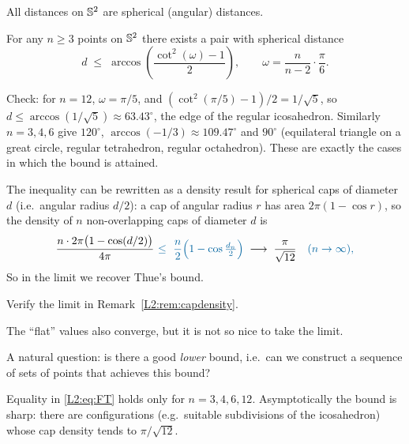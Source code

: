 All distances on $\mathbb{S}^2$ are spherical (angular) distances.

\begin{theorem}\label{L2:thm:FT}
For any $n\ge 3$ points on $\mathbb{S}^2$ there exists a pair with spherical distance
\begin{equation}\label{L2:eq:FT}
d \;\le\; \arccos\!\left(\frac{\cot^2(\omega)-1}{2}\right),
\qquad \omega=\frac{n}{n-2}\cdot\frac{\pi}{6}. \tag{$*$}
\end{equation}
\end{theorem}

\begin{addedblock}
Check: for $n=12$, $\omega=\pi/5$, and $(\cot^2(\pi/5)-1)/2 = 1/\sqrt5$, so
$d\le\arccos(1/\sqrt5)\approx 63.43^\circ$, the edge of the regular icosahedron. Similarly $n=3,4,6$ give
$120^\circ$, $\arccos(-1/3)\approx109.47^\circ$ and $90^\circ$ (equilateral triangle on a great circle,
regular tetrahedron, regular octahedron). These are exactly the cases in which the bound is attained.
\end{addedblock}

\begin{remark}\label{L2:rem:capdensity}
The inequality can be rewritten as a density result for spherical caps of diameter $d$ (i.e.\ angular
radius $d/2$): a cap of angular radius $r$ has area $2\pi(1-\cos r)$, so the density of $n$ non-overlapping
caps of diameter $d$ is
\[
\frac{n\cdot 2\pi\bigl(1-\cos(d/2)\bigr)}{4\pi}
\added{\ \le\ \frac n2\Bigl(1-\cos\tfrac{d_n}{2}\Bigr)}
\;\longrightarrow\; \frac{\pi}{\sqrt{12}}
\added{\quad (n\to\infty),}
\]
 So in the limit we recover Thue's bound.
\end{remark}

\begin{exercise}
Verify the limit in Remark~\ref{L2:rem:capdensity}. 
\end{exercise}

The ``flat'' values also converge, but it is not so nice to take the limit.

A natural question: is there a good \emph{lower} bound, i.e.\ can we construct a sequence of sets of
points that achieves this bound?
\begin{addedblock}
Equality in \eqref{L2:eq:FT} holds only for $n=3,4,6,12$. Asymptotically the bound is sharp: there are
configurations (e.g.\ suitable subdivisions of the icosahedron) whose cap density tends to
$\pi/\sqrt{12}$.
\end{addedblock}

